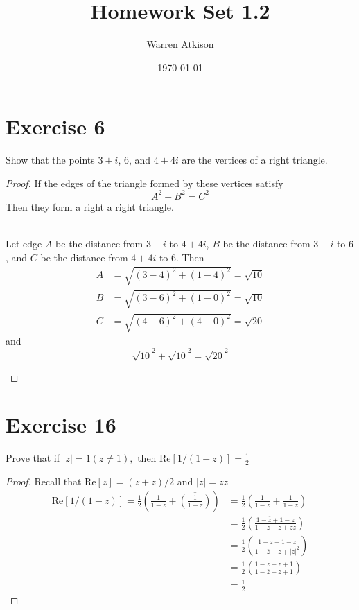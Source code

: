 \documentclass{article}
\title{Homework Set 1.2}
\author{Warren Atkison}
\date{\today}
\begin{document}
\maketitle

\section*{Exercise 6}
Show that the points $3 + i$, 6, and $4 + 4i$ are the vertices of a right triangle.
\begin{proof}
	If the edges of the triangle formed by these vertices satisfy
	\[
		A^2 + B^2 = C^2
	\]
	Then they form a right a right triangle.
	\begin{multicols}{2}
		
	 \\
	Let edge $A$ be the distance from $3 + i$ to $4 + 4i$, $B$ be the distance from $3 + i$ to $6$, and $C$ be the distance from $4 + 4i$ to $6$. Then
	\begin{align*}
		A &= \sqrt{(3 - 4)^2 + (1 - 4)^2} = \sqrt{10} \\
		B &= \sqrt{(3 - 6)^2 + (1 - 0)^2} = \sqrt{10} \\
		C &= \sqrt{(4 - 6)^2 + (4 - 0)^2} = \sqrt{20}     
	\end{align*}
	and
	\[
		\sqrt{10}^2 + \sqrt{10}^2 = \sqrt{20}^2   
	\]
	\end{multicols}
\end{proof}
\section*{Exercise 16}
Prove that if $|z| = 1 (z \neq 1),$ then Re$[1/(1 - z)] = \frac{1}{2}$
\begin{proof}
	Recall that Re$[z] = (z + \overline{z})/2$ and $|z| = z\overline{z}$
	\begin{align*}
		\text{Re}[1/(1-z)] = \frac{1}{2}\left(\frac{1}{1-z} + \overline{\left(\frac{1}{1 - z}\right)}\right) &= \frac{1}{2}\left(\frac{1}{1 - z} + \frac{1}{1 - \overline{z}}\right) \\
														     &= \frac{1}{2}\left(\frac{1 - \overline{z} + 1 - z}{1 - \overline{z} - z + z\overline{z}}\right) \\
														     &= \frac{1}{2}\left(\frac{1 - \overline{z} + 1 - z}{1 - \overline{z} - z + |z|^2}\right) \\
														     &= \frac{1}{2}\left(\frac{1 - \overline{z} - z + 1}{1 - \overline{z} - z + 1}\right)\\  &= \frac{1}{2}
	\end{align*}
\end{proof}
\newpage
\end{document}
